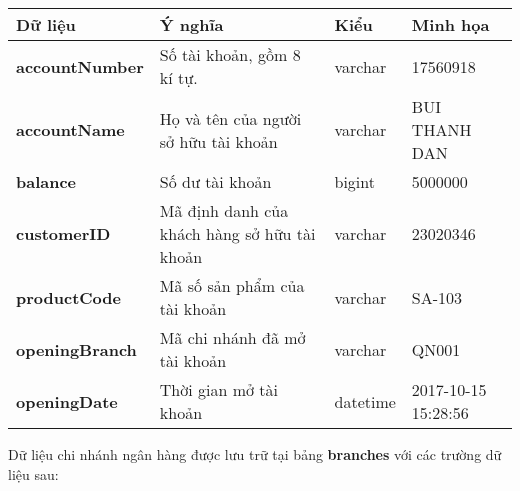 \renewcommand{\arraystretch}{2} %
\setlength{\tabcolsep}{10pt}

\begin{center}
    \begin{tabular}{ | m{9em} | m{15em}| m{5em} | m{5em} | } 
    \hline
    \rowcolor{gray!30}
    Dữ liệu & Ý nghĩa & Kiểu & Minh họa \\ 

    \hline
    \textbf{accountNumber} &
    Số tài khoản, gồm 8 kí tự. &
    varchar &
    17560918 \\

    \hline
    \textbf{accountName} &
    Họ và tên của người sở hữu tài khoản &
    varchar &
    BUI THANH DAN \\

    \hline
    \textbf{balance} &
    Số dư tài khoản &
    bigint &
    5000000 \\

    \hline
    \textbf{customerID} &
    Mã định danh của khách hàng sở hữu tài khoản &
    varchar &
    23020346\\

    \hline
    \textbf{productCode} &
    Mã số sản phẩm của tài khoản &
    varchar &
    SA-103 \\

    \hline
    \textbf{openingBranch} &
    Mã chi nhánh đã mở tài khoản &
    varchar &
    QN001 \\

    \hline
    \textbf{openingDate} &
    Thời gian mở tài khoản &
    datetime &
    2017-10-15 15:28:56 \\

    \hline
    \end{tabular}
\end{center}

\noindent
Dữ liệu chi nhánh ngân hàng được lưu trữ tại bảng \textbf{branches} với các trường dữ liệu sau:

\renewcommand{\arraystretch}{2} %
\setlength{\tabcolsep}{10pt}

